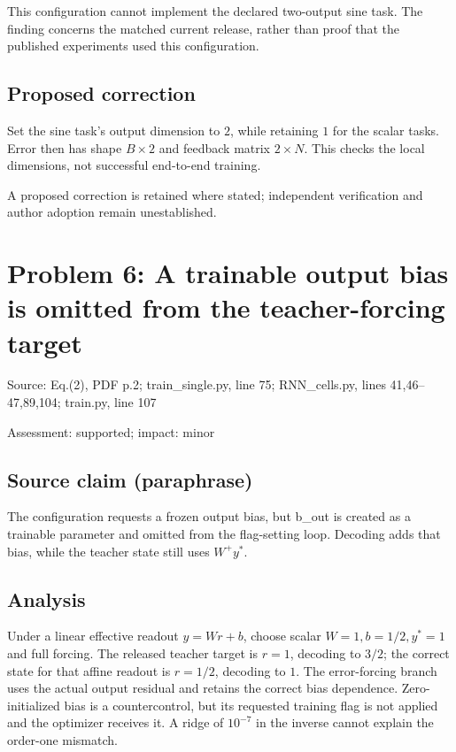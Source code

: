 \documentclass[11pt]{article}
\begin{document}
This configuration cannot implement the declared two-output sine task. The finding concerns the matched current release, rather than proof that the published experiments used this configuration.

\subsection*{Proposed correction}

Set the sine task’s output dimension to \(2\), while retaining \(1\) for the scalar tasks. Error then has shape \(B\times2\) and feedback matrix \(2\times N\). This checks the local dimensions, not successful end-to-end training.

A proposed correction is retained where stated; independent verification and author adoption remain unestablished.

\section*{Problem 6: A trainable output bias is omitted from the teacher-forcing target}

Source: Eq.(2), PDF p.2; train\_single.py, line 75; RNN\_cells.py, lines 41,46–47,89,104; train.py, line 107

Assessment: supported; impact: minor

\subsection*{Source claim (paraphrase)}

The configuration requests a frozen output bias, but b\_out is created as a trainable parameter and omitted from the flag-setting loop. Decoding adds that bias, while the teacher state still uses \(W^+y^*\).

\subsection*{Analysis}

Under a linear effective readout \(y=Wr+b\), choose scalar \(W=1,b=1/2,y^*=1\) and full forcing. The released teacher target is \(r=1\), decoding to \(3/2\); the correct state for that affine readout is \(r=1/2\), decoding to \(1\). The error-forcing branch uses the actual output residual and retains the correct bias dependence. Zero-initialized bias is a countercontrol, but its requested training flag is not applied and the optimizer receives it. A ridge of \(10^{-7}\) in the inverse cannot explain the order-one mismatch.
\end{document}
